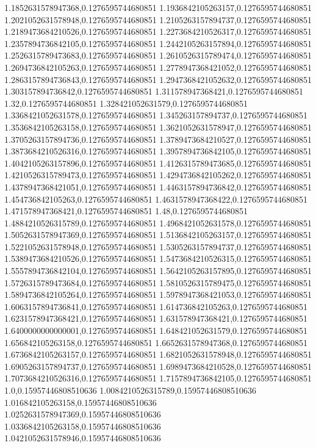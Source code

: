 1.1852631578947368,0.1276595744680851
1.1936842105263157,0.1276595744680851
1.2021052631578948,0.1276595744680851
1.2105263157894737,0.1276595744680851
1.2189473684210526,0.1276595744680851
1.2273684210526317,0.1276595744680851
1.2357894736842105,0.1276595744680851
1.2442105263157894,0.1276595744680851
1.2526315789473683,0.1276595744680851
1.2610526315789474,0.1276595744680851
1.2694736842105263,0.1276595744680851
1.2778947368421052,0.1276595744680851
1.2863157894736843,0.1276595744680851
1.2947368421052632,0.1276595744680851
1.303157894736842,0.1276595744680851
1.311578947368421,0.1276595744680851
1.32,0.1276595744680851
1.328421052631579,0.1276595744680851
1.3368421052631578,0.1276595744680851
1.345263157894737,0.1276595744680851
1.3536842105263158,0.1276595744680851
1.3621052631578947,0.1276595744680851
1.3705263157894736,0.1276595744680851
1.3789473684210527,0.1276595744680851
1.3873684210526316,0.1276595744680851
1.3957894736842105,0.1276595744680851
1.4042105263157896,0.1276595744680851
1.4126315789473685,0.1276595744680851
1.4210526315789473,0.1276595744680851
1.4294736842105262,0.1276595744680851
1.4378947368421051,0.1276595744680851
1.4463157894736842,0.1276595744680851
1.454736842105263,0.1276595744680851
1.4631578947368422,0.1276595744680851
1.471578947368421,0.1276595744680851
1.48,0.1276595744680851
1.4884210526315789,0.1276595744680851
1.4968421052631578,0.1276595744680851
1.5052631578947369,0.1276595744680851
1.5136842105263157,0.1276595744680851
1.5221052631578948,0.1276595744680851
1.5305263157894737,0.1276595744680851
1.5389473684210526,0.1276595744680851
1.5473684210526315,0.1276595744680851
1.5557894736842104,0.1276595744680851
1.5642105263157895,0.1276595744680851
1.5726315789473684,0.1276595744680851
1.5810526315789475,0.1276595744680851
1.5894736842105264,0.1276595744680851
1.5978947368421053,0.1276595744680851
1.6063157894736841,0.1276595744680851
1.614736842105263,0.1276595744680851
1.6231578947368421,0.1276595744680851
1.631578947368421,0.1276595744680851
1.6400000000000001,0.1276595744680851
1.648421052631579,0.1276595744680851
1.656842105263158,0.1276595744680851
1.6652631578947368,0.1276595744680851
1.6736842105263157,0.1276595744680851
1.6821052631578948,0.1276595744680851
1.6905263157894737,0.1276595744680851
1.6989473684210528,0.1276595744680851
1.7073684210526316,0.1276595744680851
1.7157894736842105,0.1276595744680851
1.0,0.15957446808510636
1.0084210526315789,0.15957446808510636
1.016842105263158,0.15957446808510636
1.0252631578947369,0.15957446808510636
1.0336842105263158,0.15957446808510636
1.0421052631578946,0.15957446808510636
